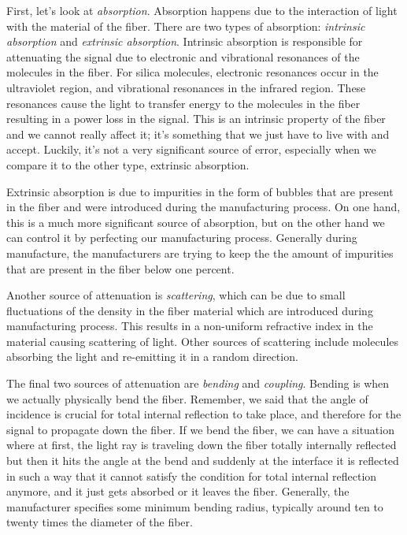 First, let's look at \emph{absorption}.
Absorption happens due to the interaction of light with the material of the fiber. There are two types of absorption: \emph{intrinsic absorption} and \emph{extrinsic absorption}. Intrinsic absorption is responsible for attenuating the signal due to electronic and vibrational resonances of the molecules in the fiber. For silica molecules, electronic resonances occur in the ultraviolet region, and vibrational resonances in the infrared region. These resonances cause the light to transfer energy to the molecules in the fiber resulting in a power loss in the signal. This is an intrinsic property of the fiber and we cannot really affect it; it's something that we just have to live with and accept. Luckily, it's not a very significant source of error, especially when we compare it to the other type, extrinsic absorption.

Extrinsic absorption is due to impurities in the form of bubbles that are present in the fiber and were introduced during the manufacturing process. On one hand, this is a much more significant source of absorption, but on the other hand we can control it by perfecting our manufacturing process. Generally during manufacture, the manufacturers are trying to keep the the amount of impurities that are present in the fiber below one percent.

Another source of attenuation is \emph{scattering}, which can be due to small fluctuations of the density in the fiber material which are introduced during manufacturing process.
This results in a non-uniform refractive index in the material causing scattering of light.
Other sources of scattering include molecules absorbing the light and re-emitting it in a random direction.

The final two sources of attenuation are \emph{bending} and \emph{coupling}. Bending is when we actually physically bend the fiber. Remember, we said that the angle of incidence is crucial for total internal reflection to take place, and therefore for the signal to propagate down the fiber. If we bend the fiber, we can have a situation where at first, the light ray is traveling down the fiber totally internally reflected but then it hits the angle at the bend and suddenly at the interface it is reflected in such a way that it cannot satisfy the condition for total internal reflection anymore, and it just gets absorbed or it leaves the fiber.  Generally, the manufacturer specifies some minimum bending radius, typically around ten to twenty times the diameter of the fiber.

